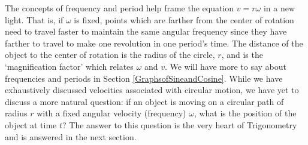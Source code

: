 \documentclass{ximera}
\begin{document}
The concepts of frequency and period help frame the equation $v = r \omega$ in a new light.  That is, if $\omega$ is fixed, points which are farther from the center of rotation need to travel faster to maintain the same angular frequency since they have farther to travel to make one revolution in one period's time.  The distance of the object to the center of rotation is the radius of the circle, $r$, and is the `magnification factor' which relates $\omega$ and $v$. We will have more to say about frequencies and periods in Section \ref{GraphsofSineandCosine}.  While we have exhaustively discussed velocities associated with circular motion, we have yet to discuss a more natural question: if an object is moving on a circular path of radius $r$ with a fixed angular velocity (frequency) $\omega$, what is the position of the object at time $t$?  The answer to this question is the very heart of Trigonometry and is answered in the next section.   





\closegraphsfile
\end{document}
